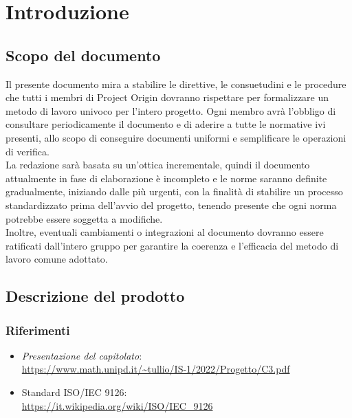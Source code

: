 \section{Introduzione}

\subsection{Scopo del documento}
Il presente documento mira a stabilire le direttive, le consuetudini e le procedure che tutti i membri di Project Origin dovranno rispettare per formalizzare un metodo di lavoro 
univoco per l'intero progetto. Ogni membro avrà l'obbligo di consultare periodicamente il documento e di aderire a tutte le normative ivi presenti, allo scopo di conseguire 
documenti uniformi e semplificare le operazioni di verifica. \\ La redazione sarà basata su un'ottica incrementale, quindi il documento attualmente in fase di elaborazione è 
incompleto e le norme saranno definite gradualmente, iniziando dalle più urgenti, con la finalità di stabilire un processo standardizzato prima dell'avvio del progetto, 
tenendo presente che ogni norma potrebbe essere soggetta a modifiche. \\ Inoltre, eventuali cambiamenti o integrazioni al documento dovranno essere ratificati dall’intero 
gruppo per garantire la coerenza e l'efficacia del metodo di lavoro comune adottato.


\subsection{Descrizione del prodotto}

\subsubsection{Riferimenti}
\begin{itemize}
    \item \textit{Presentazione del capitolato}: \\ \url{https://www.math.unipd.it/~tullio/IS-1/2022/Progetto/C3.pdf}
    \item Standard ISO/IEC 9126: \\ \url{https://it.wikipedia.org/wiki/ISO/IEC_9126}  
\end{itemize}